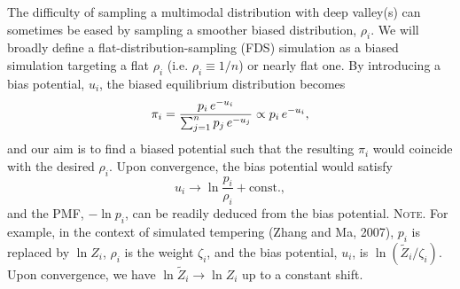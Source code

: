 \documentclass[reprint, superscriptaddress, floatfix]{revtex4-1}
\newcommand{\note}[1]{{\color{DarkGreen}\footnotesize \textsc{Note.} #1}}
\begin{document}
%
The difficulty of sampling a multimodal distribution
with deep valley(s) can sometimes be eased by
sampling a smoother biased distribution, $\rho_i$.
%
%
%
%
We will broadly define
a flat-distribution-sampling (FDS) simulation
as a biased simulation
targeting a flat $\rho_i$ (i.e. $\rho_i \equiv 1/n$)
or nearly flat one\cite{
dayal2004, *trebst2004, barducci2008, singh2011}.
%
By introducing a bias potential, $u_i$,
the biased equilibrium distribution becomes
%
\begin{equation}
  \pi_i
  =
  \frac{                p_i \, e^{-u_i} }
       { \sum_{j = 1}^n p_j \, e^{-u_j} }
  \propto
  p_i \, e^{-u_i}
  ,
  \notag
\end{equation}
%
and our aim is to find a biased potential
such that the resulting $\pi_i$ would coincide
with the desired $\rho_i$.
%
Upon convergence, the bias potential would satisfy
%
\begin{equation}
  u_i \to \ln \frac{p_i}{\rho_i} + \mathrm{const.}
  ,
  \label{eq:Vi_target}
\end{equation}
%
%
and the PMF, $-\ln p_i$, can be readily
deduced from the bias potential. %
\note{
  For example, in the context of simulated tempering (Zhang and Ma, 2007),
  $p_i$ is replaced by $\ln Z_i$,
  $\rho_i$ is the weight $\zeta_i$,
  and the bias potential, $u_i$, is $\ln (\tilde Z_i / \zeta_i)$.
  Upon convergence, we have $\ln \tilde Z_i \to \ln Z_i$
  up to a constant shift.
}
\end{document}
